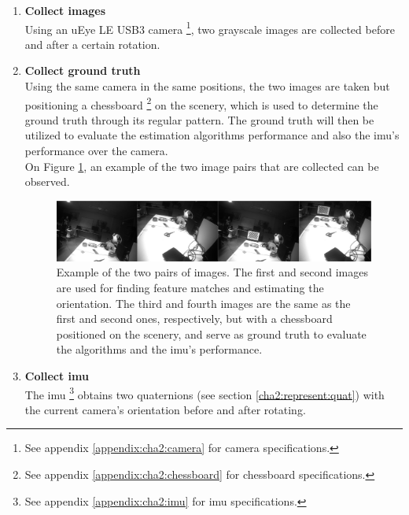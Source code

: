\begin{enumerate}
	\item \textbf{Collect images}\\
	 Using an uEye LE USB3 camera \footnote{See appendix \ref{appendix:cha2:camera} for camera specifications.}, two grayscale images are collected before and after a certain rotation.
	 
	 \item \textbf{Collect ground truth}\\
	 Using the same camera in the same positions, the two images are taken but positioning a chessboard \footnote{See appendix \ref{appendix:cha2:chessboard} for chessboard specifications.} on the scenery, which is used to determine the ground truth through its regular pattern. The ground truth will then be utilized to evaluate the estimation algorithms performance and also the \acrshort{imu}'s performance over the camera.\\
	 
	 On Figure \ref{cha3:methodology:imagesex}, an example of the two image pairs that are collected can be observed.
	 
\begin{figure}[ht]
	 \centering
	 \includegraphics[width=\textwidth]{images/imagesex.png}
	 \caption[Example of the two pairs of images]{Example of the two pairs of images. The first and second images are used for finding feature matches and estimating the orientation. The third and fourth images are the same as the first and second ones, respectively, but with a chessboard positioned on the scenery, and serve as ground truth to evaluate the algorithms and the \acrshort{imu}'s performance.}
	 \label{cha3:methodology:imagesex}
 \end{figure}
	 
	 \item \textbf{Collect \acrshort{imu}}\\
	 The \acrlong{imu} \footnote{See appendix \ref{appendix:cha2:imu} for \acrshort{imu} specifications.} obtains two quaternions (see section \ref{cha2:represent:quat}) with the current camera's orientation before and after rotating.
	 

\end{enumerate}
